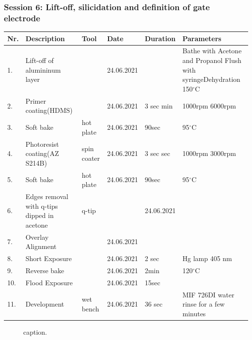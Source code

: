\documentclass[12pt, a4paper, landscape]{article}
\begin{document}
\newpage
\subsubsection*{Session 6: Lift-off, silicidation and definition of gate electrode}     
\vspace{-0.5cm}   
\begin{table}[H]
\footnotesize
\begin{tabular}{| p{0.4cm}| p{4.0cm}| p{3.0cm}|p{2.0cm}| p{2.0cm}|p{13.5cm}|}
\hline
\textbf{Nr.}&\textbf{Description} &\textbf{Tool}& \textbf{Date}  &\textbf{Duration} & \textbf{Parameters}\\ \hline\hline
1. & Lift-off of alumininum layer &  & 24.06.2021 &  & Bathe with Acetone and Propanol\newline 
Flush with syringe\newline  Dehydration 150$^{\circ}$C\\\hline

2. &Primer coating\newline (HDMS) & & 24.06.2021&  3 sec \newline 1 min&   1000rpm \newline  6000rpm \\\hline
3. &Soft bake & hot plate & 24.06.2021 & 90sec& 95$^{\circ}$C\\\hline
4. & Photoresist coating\newline (AZ S214B)& spin coater & 24.06.2021 & 3 sec\newline 60 sec & 1000rpm \newline3000rpm \\\hline
5. &Soft bake & hot plate & 24.06.2021 & 90sec& 95$^{\circ}$C\\\hline
6. & Edges removal with q-tips dipped  in acetone& q-tip & & 24.06.2021 &  \\\hline
7. & Overlay Alignment &  &   24.06.2021 & &\\\hline
8. & Short Exposure&  &    24.06.2021&2 sec & Hg lamp 405 nm \\\hline
9. & Reverse bake & & 24.06.2021&2min & 120$^{\circ}$C\\\hline
10. & Flood Exposure&  &    24.06.2021& 15sec &\\\hline
11. & Development& wet bench &   24.06.2021&  36 sec & MIF 726\newline DI water rinse for a few minutes \\\hline
\end{tabular}
\end{table} 

\vspace{-0.5cm}   
\begin{figure}[H]
	\centering
  \caption{caption.}
\end{figure}
\end{document}
